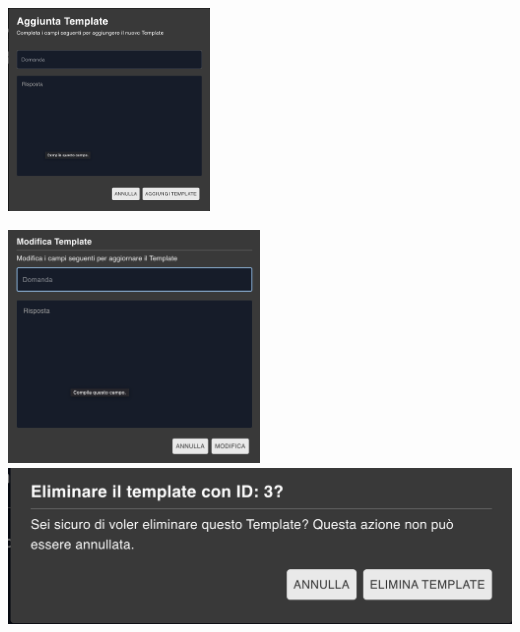 \begin{center}
    \includegraphics[width=0.4\textwidth]{./img/AggiungiTemplate.png}
    \label{fig:addTemplate}
\end{center}

\begin{center}
    \includegraphics[width=0.5\textwidth]{./img/ModificaTemplate.png}
    \hspace{0.05\textwidth}
    \includegraphics[width=\textwidth]{./img/EliminaTemplate.png}
    \label{fig:pop-up modifica ed elimina}
\end{center}

